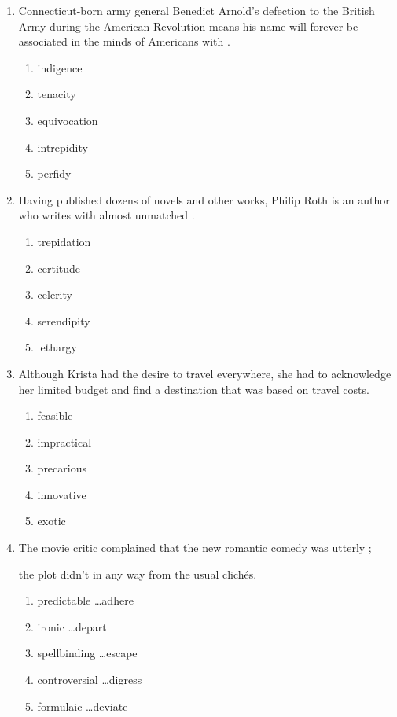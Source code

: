 \begin{enumerate}
\bigskip
\item Connecticut-born army general Benedict Arnold's defection to the British Army during the American Revolution means his name will forever be associated in the minds of Americans with \longline.
\begin{enumerate}[label=(\Alph*)]
\item indigence
\item tenacity
\item equivocation
\item intrepidity
\item perfidy
\end{enumerate}

\bigskip
\item Having published dozens of novels and other works, Philip Roth is an author who writes with almost unmatched \longline.
\begin{enumerate}[label=(\Alph*)]
\item trepidation
\item certitude
\item celerity
\item serendipity
\item lethargy
\end{enumerate}

\bigskip
\item Although Krista had the desire to travel everywhere, she had to acknowledge her limited budget and find a destination that was \longline based on travel costs.
\begin{enumerate}[label=(\Alph*)]
\item feasible
\item impractical
\item precarious
\item innovative
\item exotic
\end{enumerate}

\bigskip
\item The movie critic complained that the new romantic comedy was utterly \hrulefill;

the plot didn't \longline  in any way from the usual clich\'es. 

\begin{enumerate}[label=(\Alph*)]
\item predictable \ldots adhere
\item ironic \ldots depart
\item spellbinding \ldots escape
\item controversial \ldots digress
\item formulaic \ldots deviate 
\end{enumerate}


\end{enumerate}
